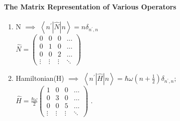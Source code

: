  \paragraph{The Matrix Representation of Various Operators}
 \begin{enumerate}
 	\item N $\implies$
 		$\left\langle n^{\prime}|\hat{N}| n\right\rangle=n \delta_{n^{\prime}, n}$ \\
 		$\hat{N}=\left(\begin{array}{cccc}
 			0 & 0 & 0 & \ldots \\
 			0 & 1 & 0 & \ldots \\
 			0 & 0 & 2 & \ldots \\
 			\vdots & \vdots & \vdots & \ddots
 		\end{array}\right)$
 	\item Hamiltonian(H) $\implies$
 	$\left\langle n^{\prime}|\hat{H}| n\right\rangle=\hbar \omega\left(n+\frac{1}{2}\right) \delta_{n^{\prime}, n} ;$ \\
 	$\hat{H}=\frac{\hbar \omega}{2}\left(\begin{array}{cccc}
 	1 & 0 & 0 & \ldots \\
 	0 & 3 & 0 & \ldots \\
 	0 & 0 & 5 & \ldots \\
 	\vdots & \vdots & \vdots & \ddots
 	\end{array}\right)$ .
 

\end{enumerate}
